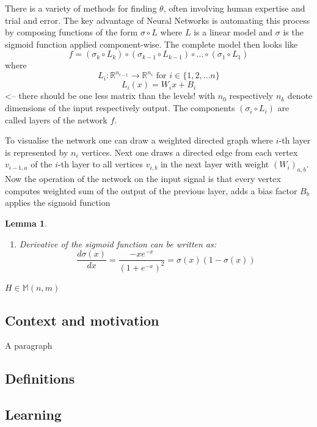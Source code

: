 \documentclass[a4paper]{article}
\theoremstyle{break}
\newtheorem{lemma}[theorem]{Lemma}
\newcommand{\R}{\mathbb{R}}
\newcommand{\Mat}[2]{\mathbb{M}(#1, #2)}
\begin{document}
There is a variety of methods for finding $\theta$, often involving human expertise and trial and error. The key advantage of Neural Networks is automating this process by composing functions of the form $ \sigma \circ L$ where $L$ is a linear model and $\sigma$ is the sigmoid function applied component-wise.
The complete model then looks like
$$ f = (\sigma_{k} \circ L_{k}) \circ (\sigma_{k-1} \circ L_{k-1}) \circ \ldots \circ (\sigma_{1} \circ L_{1}) $$
where
$$ L_i : \R^{n_{i-1}} \to \R^{n_{i}} \text{ for } i \in \{1, 2, \ldots n\} $$
$$ L_i(x) = W_i x + B_i $$
<-- there should be one less matrix than the levels!
with $ n_0 $ respectively $ n_k $ denote dimensions of the input respectively output. 
The components $ (\sigma_{i} \circ L_{i}) $ are called layers of the network $f$.

To visualise the network one can draw a weighted directed graph where $i$-th layer is represented by $n_i$ vertices. Next one draws a directed edge from each vertex $v_{i-1,a} $ of the $i$-th layer to all vertices $v_{i, b}$ in the next layer with weight $ (W_i)_{a,b} $.
Now the operation of the network on the input signal is that every vertex computes weighted sum of the output of the previous layer, adds a bias factor $B_b$ applies the sigmoid function
\pagebreak
\begin{lemma} %
    \begin{enumerate}
        \item Derivative of the sigmoid function can be written as:
            $$ \frac{d \sigma (x)}{dx} = \frac{- x e^{-x}}{(1 + e^{-x})^2} = \sigma(x) (1 - \sigma(x)) $$
    \end{enumerate}
\end{lemma}
    
$H \in \Mat{n}{m}$
\subsection{Context and motivation}
A paragraph
\subsection{Definitions}
\subsection{Learning}
\end{document}
